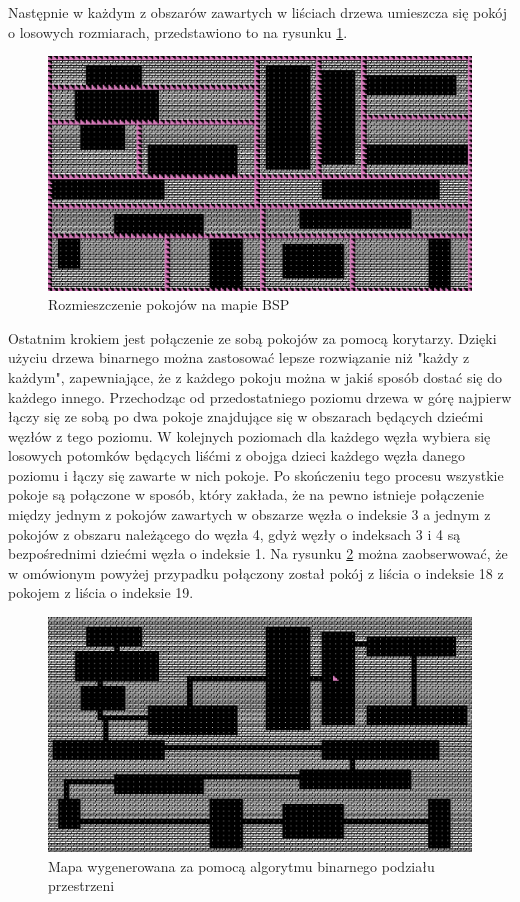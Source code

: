 \documentclass[12pt,twoside]{article}
\begin{document}
Następnie w każdym z obszarów zawartych w liściach drzewa umieszcza się pokój o losowych rozmiarach, przedstawiono to na rysunku \ref{generators:bsp_rooms}.

\FloatBarrier
\begin{figure}[ht]
	\centering
	\includegraphics[width=12cm]{images/generators/bsp_rooms.png}
	\caption{Rozmieszczenie pokojów na mapie BSP}
	\label{generators:bsp_rooms}
\end{figure}
\FloatBarrier

Ostatnim krokiem jest połączenie ze sobą pokojów za pomocą korytarzy. Dzięki użyciu drzewa binarnego można zastosować lepsze rozwiązanie niż "każdy z każdym", zapewniające, że z każdego pokoju można w jakiś sposób dostać się do każdego innego. Przechodząc od przedostatniego poziomu drzewa w górę najpierw łączy się ze sobą po dwa pokoje znajdujące się w obszarach będących dziećmi węzłów z tego poziomu. W kolejnych poziomach dla każdego węzła wybiera się losowych potomków będących liśćmi z obojga dzieci każdego węzła danego poziomu i łączy się zawarte w nich pokoje. Po skończeniu tego procesu wszystkie pokoje są połączone w sposób, który zakłada, że na pewno istnieje połączenie między jednym z pokojów zawartych w obszarze węzła o indeksie 3 a jednym z pokojów z obszaru należącego do węzła 4, gdyż węzły o indeksach 3 i 4 są bezpośrednimi dziećmi węzła o indeksie 1. Na rysunku \ref{generators:bsp_done} można zaobserwować, że w omówionym powyżej przypadku połączony został pokój z liścia o indeksie 18 z pokojem z liścia o indeksie 19.

\FloatBarrier
\begin{figure}[ht]
	\centering
	\includegraphics[width=14cm]{images/generators/bsp_done.png}
	\caption{Mapa wygenerowana za pomocą algorytmu binarnego podziału przestrzeni}
	\label{generators:bsp_done}
\end{figure}
\FloatBarrier
\end{document}
